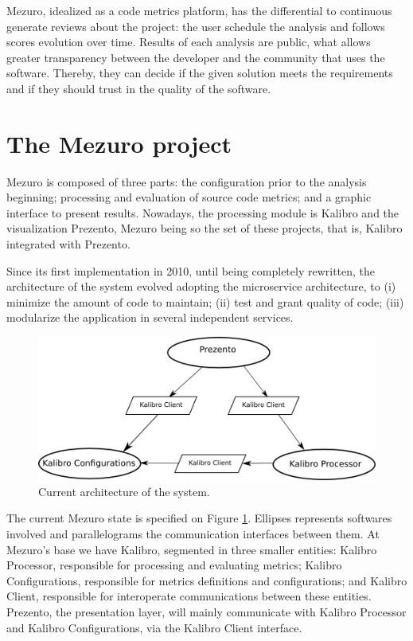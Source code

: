 \documentclass{llncs}
\begin{document}
Mezuro, idealized as a code metrics platform, has the differential to
continuous generate reviews about the project: the user schedule the
analysis and follows scores evolution over time. Results of each analysis
are public, what allows greater transparency between the developer and the
community that uses the software. Thereby, they can decide if the given solution
meets the requirements and if they should trust in the quality of the software.

\section{The Mezuro project}
\label{sec:mezuro}

Mezuro is composed of three parts: the configuration prior to the analysis beginning;
processing and evaluation of source code metrics; and a graphic interface to
present results. Nowadays, the processing module is Kalibro and the visualization
Prezento, Mezuro being so the set of these projects, that is, Kalibro integrated
with Prezento.

Since its first implementation in 2010\cite{mezuro2012}, until being completely
rewritten, the architecture of the system evolved adopting the microservice architecture\cite{namiot2014micro},
to (i) minimize the amount of code to maintain;
(ii) test and grant quality of code;
(iii) modularize the application in several independent services.

\begin{figure}[hbt]
  \centering
    \includegraphics[width=\textwidth]{images/mezuro-architecturev3.png}
  \caption{Current architecture of the system.}
  \label{fig:architecture-2}
\end{figure}


The current Mezuro state is specified on Figure \ref{fig:architecture-2}. Ellipses represents
softwares involved and parallelograms the communication interfaces between them. At Mezuro's
base we have Kalibro, segmented in three smaller entities: Kalibro Processor, responsible for
processing and evaluating metrics;
Kalibro Configurations, responsible for metrics definitions and configurations;
and Kalibro Client, responsible for interoperate communications between these entities. 
Prezento, the presentation layer, will mainly communicate with Kalibro Processor and
Kalibro Configurations, via the Kalibro Client interface.
\end{document}

